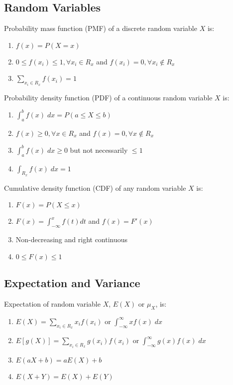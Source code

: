 \documentclass[12pt, a4paper]{article}
\begin{document}
\begin{multicols*}{3}
\colbreak
\section{Random Variables}
Probability mass function (PMF) of a discrete random variable $X$ is:
\begin{enumerate}[\roman*.]
  \item $f(x) = P(X=x)$
  \item $0 \leq f(x_i) \leq 1, \forall x_i\in R_x$ and $f(x_i) = 0,\forall x_i \not\in R_x$
  \item $\sum_{x_i\in R_x} f(x_i) = 1$
\end{enumerate}

Probability density function (PDF) of a continuous random variable $X$ is:
\begin{enumerate}[\roman*.]
  \item $\int^b_a f(x)\;dx = P(a\leq X\leq b)$
  \item $f(x) \geq 0, \forall x\in R_x$ and $f(x) = 0, \forall x \not\in R_x$
  \item $\int_a^b f(x)\;dx \geq 0$ but not necessarily $\leq 1$
  \item $\int_{R_x} f(x)\;dx = 1$
\end{enumerate}

Cumulative density function (CDF) of any random variable $X$ is:
\begin{enumerate}[\roman*.]
  \item $F(x) = P(X \leq x)$
  \item $F(x) = \int^x_{-\infty}f(t)dt$ and $f(x) = F'(x)$
  \item Non-decreasing and right continuous 
  \item $0 \leq F(x) \leq 1$
\end{enumerate}

\subsection{Expectation and Variance}
Expectation of random variable $X$, $E(X)$ or $\mu_X$, is:
\begin{enumerate}[\roman*.]
  \item $E(X) = \sum_{x_i\in R_x} x_if(x_i)$ or $\int^{\infty}_{-\infty}xf(x)\;dx$
  \item $E[g(X)] = \sum_{x_i\in R_x} g(x_i)f(x_i)$ or $\int^{\infty}_{-\infty}g(x)f(x)\;dx$
  \item $E(aX+b) = aE(X) + b$
  \item $E(X+Y) = E(X) + E(Y)$
\end{enumerate}


\end{multicols*}
\end{document}
